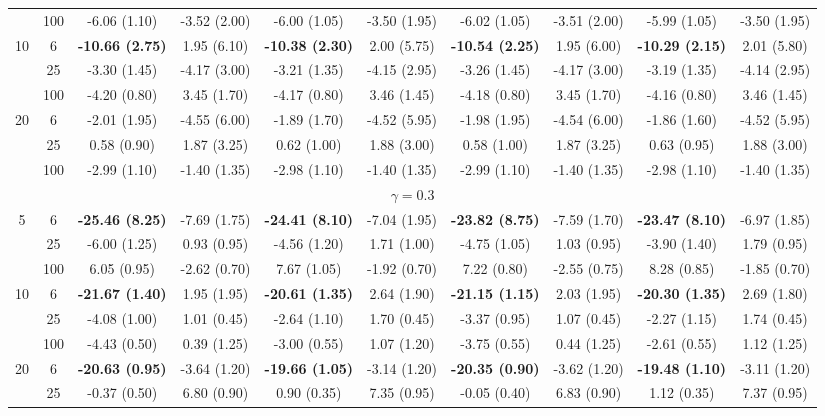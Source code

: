 \documentclass[
  man]{apa6}
\newenvironment{lltable}{\begin{landscape}\centering\begin{ThreePartTable}}{\end{ThreePartTable}\end{landscape}}
\begin{document}
\begin{lltable}
{\begin{longtable}{cccccccccc}
 & 100 & -6.06 (1.10) & -3.52 (2.00) & -6.00 (1.05) & -3.50 (1.95) & -6.02 (1.05) & -3.51 (2.00) & -5.99 (1.05) & -3.50 (1.95)\\
10 & 6 & \textbf{-10.66 (2.75)} & 1.95 (6.10) & \textbf{-10.38 (2.30)} & 2.00 (5.75) & \textbf{-10.54 (2.25)} & 1.95 (6.00) & \textbf{-10.29 (2.15)} & 2.01 (5.80)\\
 & 25 & -3.30 (1.45) & -4.17 (3.00) & -3.21 (1.35) & -4.15 (2.95) & -3.26 (1.45) & -4.17 (3.00) & -3.19 (1.35) & -4.14 (2.95)\\
 & 100 & -4.20 (0.80) & 3.45 (1.70) & -4.17 (0.80) & 3.46 (1.45) & -4.18 (0.80) & 3.45 (1.70) & -4.16 (0.80) & 3.46 (1.45)\\
20 & 6 & -2.01 (1.95) & -4.55 (6.00) & -1.89 (1.70) & -4.52 (5.95) & -1.98 (1.95) & -4.54 (6.00) & -1.86 (1.60) & -4.52 (5.95)\\
 & 25 & 0.58 (0.90) & 1.87 (3.25) & 0.62 (1.00) & 1.88 (3.00) & 0.58 (1.00) & 1.87 (3.25) & 0.63 (0.95) & 1.88 (3.00)\\
 & 100 & -2.99 (1.10) & -1.40 (1.35) & -2.98 (1.10) & -1.40 (1.35) & -2.99 (1.10) & -1.40 (1.35) & -2.98 (1.10) & -1.40 (1.35)\\
\multicolumn{10}{c}{$\gamma = 0.3$}\\
5 & 6 & \textbf{-25.46 (8.25)} & -7.69 (1.75) & \textbf{-24.41 (8.10)} & -7.04 (1.95) & \textbf{-23.82 (8.75)} & -7.59 (1.70) & \textbf{-23.47 (8.10)} & -6.97 (1.85)\\
 & 25 & -6.00 (1.25) & 0.93 (0.95) & -4.56 (1.20) & 1.71 (1.00) & -4.75 (1.05) & 1.03 (0.95) & -3.90 (1.40) & 1.79 (0.95)\\
 & 100 & 6.05 (0.95) & -2.62 (0.70) & 7.67 (1.05) & -1.92 (0.70) & 7.22 (0.80) & -2.55 (0.75) & 8.28 (0.85) & -1.85 (0.70)\\
10 & 6 & \textbf{-21.67 (1.40)} & 1.95 (1.95) & \textbf{-20.61 (1.35)} & 2.64 (1.90) & \textbf{-21.15 (1.15)} & 2.03 (1.95) & \textbf{-20.30 (1.35)} & 2.69 (1.80)\\
 & 25 & -4.08 (1.00) & 1.01 (0.45) & -2.64 (1.10) & 1.70 (0.45) & -3.37 (0.95) & 1.07 (0.45) & -2.27 (1.15) & 1.74 (0.45)\\
 & 100 & -4.43 (0.50) & 0.39 (1.25) & -3.00 (0.55) & 1.07 (1.20) & -3.75 (0.55) & 0.44 (1.25) & -2.61 (0.55) & 1.12 (1.25)\\
20 & 6 & \textbf{-20.63 (0.95)} & -3.64 (1.20) & \textbf{-19.66 (1.05)} & -3.14 (1.20) & \textbf{-20.35 (0.90)} & -3.62 (1.20) & \textbf{-19.48 (1.10)} & -3.11 (1.20)\\
 & 25 & -0.37 (0.50) & 6.80 (0.90) & 0.90 (0.35) & 7.35 (0.95) & -0.05 (0.40) & 6.83 (0.90) & 1.12 (0.35) & 7.37 (0.95)\\

\end{longtable}}
\end{lltable}
\end{document}
